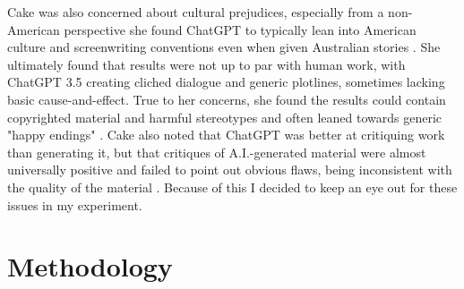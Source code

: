 \documentclass[sigconf]{acmart}
\begin{document}
\indent Cake was also concerned about cultural prejudices, especially from a non-American perspective she found ChatGPT to typically lean into American culture and screenwriting conventions even when given Australian stories \cite{Cake20012025}. She ultimately found that results were not up to par with human work, with ChatGPT 3.5 creating cliched dialogue and generic plotlines, sometimes lacking basic cause-and-effect. True to her concerns, she found the results could contain copyrighted material and harmful stereotypes and often leaned towards generic "happy endings" \cite{Cake20012025}. Cake also noted that ChatGPT was better at critiquing work than generating it, but that critiques of A.I.-generated material were almost universally positive and failed to point out obvious flaws, being inconsistent with the quality of the material \cite{Cake20012025}. Because of this I decided to keep an eye out for these issues in my experiment.
\section{Methodology}
\end{document}

